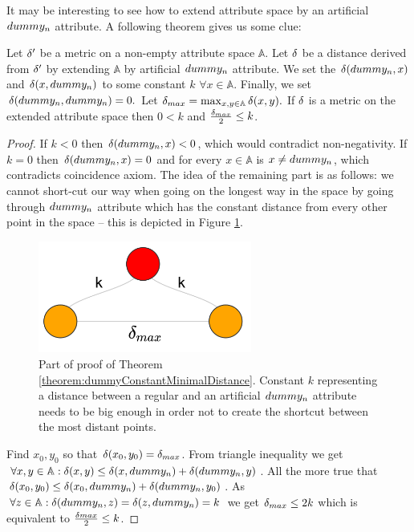 It may be interesting to see how to extend attribute space by an artificial $dummy_n$ attribute. A following theorem gives us some clue: 
\begin{theorem}
	\label{theorem:dummyConstantMinimalDistance}
		Let $\delta'$ be a metric on a non-empty attribute space $\mathbb{A}$.	Let $\delta$ be a distance derived from $\delta'$ by extending  $\mathbb{A}$ by artificial $dummy_n$ attribute. We set the $\delta(dummy_n, x)$ and $\delta(x, dummy_n)$ to some constant $k$ $\forall x \in \mathbb{A}$. Finally, we set $\delta(dummy_n, dummy_n)=0.$ Let $\delta_{max}=\max_{x,y \in \mathbb{A}}\delta(x,y).$ If $\delta$ is a metric on the extended attribute space then $0 < k$ and $\frac{\delta_{max}}{2} \le k$.	
	\begin{proof}
		If $k < 0$ then $\delta(dummy_n, x)<0$, which would contradict non-negativity. If $k = 0$ then $\delta(dummy_n, x)=0$ and for every $x \in \mathbb{A}$ is $x \ne dummy_n$, which contradicts coincidence axiom.   
	The idea of the remaining part is as follows: we cannot short-cut our way when going on the longest way in the space by going through $dummy_n$ attribute which has the constant distance from every other point in the space -- this is depicted in Figure \ref{fig:constDummyTheorem}. 
	\begin{figure}	
		\includegraphics[width=7cm]{Images/constDummyTheorem.png}
		\centering
		\caption{Part of proof of Theorem \ref{theorem:dummyConstantMinimalDistance}. Constant $k$ representing a distance between a regular and an artificial  $dummy_n$ attribute  needs to be big enough in order not to create the shortcut between the most distant points.}	
		\label{fig:constDummyTheorem}	
	\end{figure}
	Find $x_0, y_0$ so that $\delta(x_0,y_0)=\delta_{max}$. From triangle inequality we get $ \forall x,y \in \mathbb{A}: \delta(x,y) \le \delta(x, dummy_n) + \delta(dummy_n, y)$. All the more true that $\delta(x_0,y_0) \le \delta(x_0, dummy_n) + \delta(dummy_n, y_0)$. As $\forall z \in \mathbb{A}:  \delta(dummy_n, z) = \delta(z, dummy_n) = k$ we get $\delta_{max} \le 2k$ which is equivalent to $\frac{\delta{max}}{2} \le k$.	
	\end{proof}
\end{theorem}
